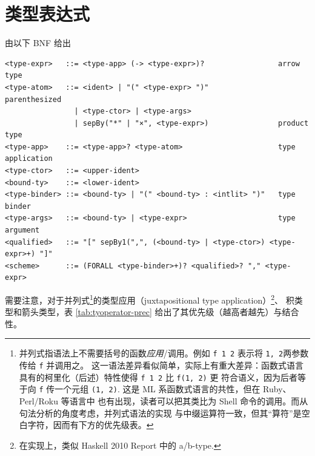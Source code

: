 \section{类型表达式}
\begin{definition}[类型表达式]\label{def:tyexp} 由以下 BNF 给出
\begin{verbatim}
<type-expr>   ::= <type-app> (-> <type-expr>)?                 arrow type
<type-atom>   ::= <ident> | "(" <type-expr> ")"                parenthesized
                | <type-ctor> | <type-args>
                | sepBy("*" | "×", <type-expr>)                product type
<type-app>    ::= <type-app>? <type-atom>                      type application
<type-ctor>   ::= <upper-ident>
<bound-ty>    ::= <lower-ident>
<type-binder> ::= <bound-ty> | "(" <bound-ty> : <intlit> ")"   type binder
<type-args>   ::= <bound-ty> | <type-expr>                     type argument
<qualified>   ::= "[" sepBy1(",", (<bound-ty> | <type-ctor>) <type-expr>+) "]"
<scheme>      ::= (FORALL <type-binder>+)? <qualified>? "," <type-expr>
\end{verbatim}
\end{definition}
需要注意，对于并列式\footnote{
  并列式指语法上不需要括号的函数\emph{应用}/调用。例如 \texttt{f 1 2} 表示将 \texttt{1, 2}两参数传给 \texttt{f} 并调用之。
  这一语法差异看似简单，实际上有重大差异：函数式语言具有的柯里化（后述）特性使得 \texttt{f 1 2} 比 \texttt{f(1, 2)} 更
  符合语义，因为后者等于向 \texttt{f} 传一个元组 \texttt{(1, 2)}. 这是 ML 系函数式语言的共性，但在 Ruby、Perl/Roku 等语言中
  也有出现，读者可以把其类比为 Shell 命令的调用。而从句法分析的角度考虑，并列式语法的实现
  与中缀运算符一致，但其“算符”是空白字符，因而有下方的优先级表。
}的类型应用（juxtapositional type application）\footnote{
  在实现上，类似 Haskell 2010 Report 中的 a/b-type.
}、
积类型和箭头类型，表 \ref{tab:tyoperator-prec} 给出了其优先级（越高者越先）与结合性。
